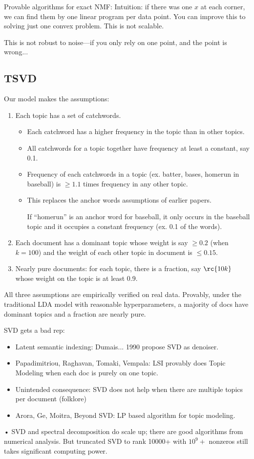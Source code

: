 Provable algorithms for exact NMF: Intuition: if there was one $x$ at each corner, we can find them by one linear program per data point. You can improve this to solving just one convex problem. This is not scalable. 

This is not robust to noise---if you only rely on one point, and the point is wrong...

\subsection{TSVD}

Our model makes the assumptions:
\begin{enumerate}
\item
Each topic has a set of catchwords. 
\begin{itemize}
\item
Each catchword has a higher frequency in the topic than in other topics.
\item
All catchwords for a topic together have frequency at least a constant, say 0.1.
\item Frequency of each catchwords in a topic (ex. batter, bases, homerun in baseball) is $\ge 1.1$ times frequency in any other topic. %
\item
This replaces the anchor words assumptions of earlier papers.

If ``homerun'' is an anchor word for baseball, it only occurs in the baseball topic and it occupies a constant frequency (ex. 0.1 of the words).
\end{itemize}
\item
Each document has a dominant topic whose weight is say $\ge 0.2$ (when $k=100$) and the weight of each other topic in document is $\le 0.15$.
\item
Nearly pure documents: for each topic, there is a fraction, say $\rc{10k}$ whose weight on the topic is at least 0.9.
\end{enumerate}

All three assumptions are empirically verified on real data. 
Provably, under the traditional LDA model with reasonable hyperparameters,  a majority of docs have dominant topics and a fraction are nearly pure.

SVD gets a bad rep:
\begin{itemize}
\item
Latent semantic indexing: Dumais... 1990 propose SVD as denoiser.
\item
Papadimitriou, Raghavan, Tomaki, Vempala: LSI provably does Topic Modeling when each doc is purely on one topic.
\item
Unintended consequence: SVD does not help when there are multiple topics per document (folklore)
\item
Arora, Ge, Moitra, Beyond SVD: LP based algorithm for topic modeling.
\end{itemize}•
SVD and spectral decomposition do scale up; there are good algorithms from numerical analysis. But truncated SVD to rank 10000+ with $10^9+$ nonzeros still takes significant computing power.

